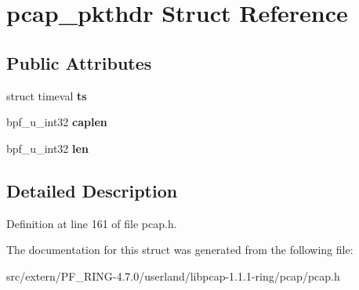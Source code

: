 \hypertarget{structpcap__pkthdr}{
\section{pcap\_\-pkthdr Struct Reference}
\label{structpcap__pkthdr}
}
\subsection*{Public Attributes}
\begin{DoxyCompactItemize}
\item 
\hypertarget{structpcap__pkthdr_a9b962b31b210049db42132e0a6ec57e4}{
struct timeval {\bfseries ts}}
\label{structpcap__pkthdr_a9b962b31b210049db42132e0a6ec57e4}

\item 
\hypertarget{structpcap__pkthdr_a542c2264081f2105a67a4637d719a8b0}{
bpf\_\-u\_\-int32 {\bfseries caplen}}
\label{structpcap__pkthdr_a542c2264081f2105a67a4637d719a8b0}

\item 
\hypertarget{structpcap__pkthdr_abed36f818ed862b417b9eeaca4e896da}{
bpf\_\-u\_\-int32 {\bfseries len}}
\label{structpcap__pkthdr_abed36f818ed862b417b9eeaca4e896da}

\end{DoxyCompactItemize}


\subsection{Detailed Description}


Definition at line 161 of file pcap.h.



The documentation for this struct was generated from the following file:\begin{DoxyCompactItemize}
\item 
src/extern/PF\_\-RING-\/4.7.0/userland/libpcap-\/1.1.1-\/ring/pcap/pcap.h\end{DoxyCompactItemize}
